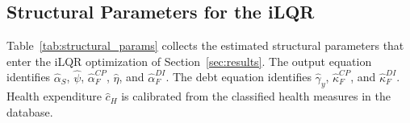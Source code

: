 
\subsection{Structural Parameters for the iLQR}
\label{subsec:parameters_ilqr}

Table~\ref{tab:structural_params} collects the estimated structural parameters that enter the iLQR optimization of Section~\ref{sec:results}. The output equation identifies $\hat{\alpha}_S$, $\hat{\psi}$, $\hat{\alpha}_F^{CP}$, $\hat{\eta}$, and $\hat{\alpha}_F^{DI}$. The debt equation identifies $\hat{\gamma}_y$, $\hat{\kappa}_F^{CP}$, and $\hat{\kappa}_F^{DI}$. Health expenditure $\hat{c}_H$ is calibrated from the classified health measures in the database.

